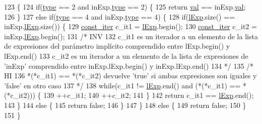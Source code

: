 \begin{DoxyCode}
123 \{
124   \textcolor{keywordflow}{if}(\hyperlink{class_expression_a2c094b93c4863b1f851ea2136aae9612}{type} == 2 and inExp.\hyperlink{class_expression_a2c094b93c4863b1f851ea2136aae9612}{type} == 2) \{
125     \textcolor{keywordflow}{return} \hyperlink{class_expression_a9c15b529b5d59e6bffb3855e384c04aa}{val} == inExp.\hyperlink{class_expression_a9c15b529b5d59e6bffb3855e384c04aa}{val};
126   \}
127   \textcolor{keywordflow}{else} \textcolor{keywordflow}{if}(\hyperlink{class_expression_a2c094b93c4863b1f851ea2136aae9612}{type} == 4 and inExp.\hyperlink{class_expression_a2c094b93c4863b1f851ea2136aae9612}{type} == 4) \{
128     \textcolor{keywordflow}{if}(\hyperlink{class_expression_afb4f4617291f7e182cbf2252151b122a}{lExp}.size() == inExp.\hyperlink{class_expression_afb4f4617291f7e182cbf2252151b122a}{lExp}.size()) \{
129       \hyperlink{_expression_8cc_a6ff59711533978050143f1bfb54c33b1}{const\_iter} c\_it1 = \hyperlink{class_expression_afb4f4617291f7e182cbf2252151b122a}{lExp}.begin();
130       \hyperlink{_expression_8cc_a6ff59711533978050143f1bfb54c33b1}{const\_iter} c\_it2 = inExp.\hyperlink{class_expression_afb4f4617291f7e182cbf2252151b122a}{lExp}.begin();
131       \textcolor{comment}{/* INV}
132 \textcolor{comment}{        c\_it1 es un iterador a un elemento de la lista de expresiones del parámetro implícito comprendido
       entre lExp.begin() y lExp.end()}
133 \textcolor{comment}{        c\_it2 es un iterador a un elemento de la lista de expresiones de 'inExp' comprendido entre
       inExp.lExp.begin() y inExp.lExp.end()}
134 \textcolor{comment}{      */}
135       \textcolor{comment}{/* HI}
136 \textcolor{comment}{        *(*c\_it1) == *(*c\_it2) devuelve 'true' si ambas expresiones son iguales y 'false' en otro caso}
137 \textcolor{comment}{      */}
138       \textcolor{keywordflow}{while}(c\_it1 != \hyperlink{class_expression_afb4f4617291f7e182cbf2252151b122a}{lExp}.end() and (*(*c\_it1) == *(*c\_it2))) \{
139         ++c\_it1;
140         ++c\_it2;
141       \}
142       \textcolor{keywordflow}{return} c\_it1 == \hyperlink{class_expression_afb4f4617291f7e182cbf2252151b122a}{lExp}.end();
143     \}
144     \textcolor{keywordflow}{else} \{
145       \textcolor{keywordflow}{return} \textcolor{keyword}{false};
146     \}
147   \}
148   \textcolor{keywordflow}{else} \{
149     \textcolor{keywordflow}{return} \textcolor{keyword}{false};
150   \}
151 \}
\end{DoxyCode}
